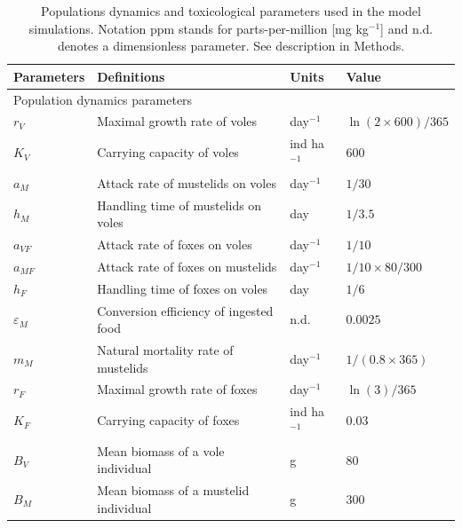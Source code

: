 \documentclass[11pt]{article}
\begin{document}



%
%



\newpage


\begin{table}
\caption{Populations dynamics and toxicological parameters used in the model simulations. Notation ppm stands for parts-per-million [mg kg$^{-1}$] and n.d. denotes a dimensionless parameter. See description in Methods.}
\label{tab:parameterization}
\begin{tabular}{l p{7cm} l p{3cm}}
\hline
Parameters & Definitions & Units & Value\\
\hline
\multicolumn{2}{l}{Population dynamics parameters}  & & \\
\hline
%
$r_V$ & Maximal growth rate of voles & day$^{-1}$ & $\ln(2\times600)/365$ \\
$K_V$ & Carrying capacity of voles & ind ha$^{-1}$ & $600$  \\
%
%
$a_M$ & Attack rate of mustelids on voles & day$^{-1}$ & $1/30$ \\
$h_M$ &  Handling time of mustelids on voles & day & $1/3.5$\\
$a_{VF}$ & Attack rate of foxes on voles & day$^{-1}$ & $1/10$ \\
$a_{MF}$ & Attack rate of foxes on mustelids & day$^{-1}$ & $1/10 \times 80/300$ \\
$h_F$ &  Handling time of foxes on voles & day & $1/6$\\
%
%
$\varepsilon_M$ & Conversion efficiency of ingested food & n.d. & $0.0025$ \\
$m_M$ & Natural mortality rate of mustelids & day$^{-1}$ & $1/(0.8 \times 365)$\\
%
%
$r_F$ & Maximal growth rate of foxes & day$^{-1}$ & $\ln(3)/365$ \\
$K_F$ & Carrying capacity of foxes & ind ha$^{-1}$ & $0.03$ \\
%
%
$B_V$ & Mean biomass of a vole individual & g & $80$ \\
$B_M$ & Mean biomass of a mustelid individual & g & $300$ \\

\end{tabular}
\end{table}
\end{document}
